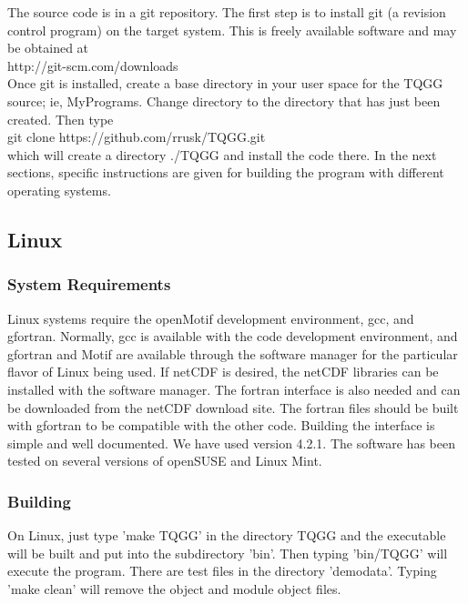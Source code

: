 \documentclass{article}
\begin{document}
The source code is in a git repository. The first step is to install git (a revision control program)
on the target system. This is freely available software and may be obtained at \\

\noindent http://git-scm.com/downloads \\

Once git is installed, create a base directory in your user space for the TQGG source; ie, MyPrograms.
Change directory to the directory that has just been created. Then type \\

\noindent git clone https://github.com/rrusk/TQGG.git \\

\noindent which will create a directory ./TQGG and install the code there. In the next sections, 
specific instructions are given for building the program with different operating systems.


\subsection{Linux}
\subsubsection{System Requirements}
Linux systems require the openMotif development environment, gcc, and gfortran. Normally, gcc is 
available with the code development environment, and gfortran and Motif are available through
the software manager for the particular flavor of Linux being used. If netCDF is desired, the netCDF 
libraries can be installed with the software manager. The fortran interface is also needed and can be 
downloaded from the netCDF download site. The fortran files should be built with gfortran to be compatible
with the other code. Building the interface is simple and well documented. We have used version 4.2.1.
The software has been
tested on several versions of openSUSE and Linux Mint. 

\subsubsection{Building}
On Linux, just type 'make TQGG' in the directory TQGG and the executable will be built and put into the
subdirectory 'bin'. Then typing 'bin/TQGG' will execute the program. There are test files in 
the directory 'demodata'. Typing 'make clean' will remove the object and module object files.
\end{document}
